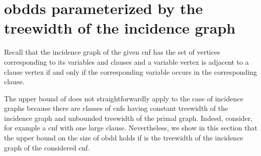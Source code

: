 \documentclass{article}
\begin{document}
\section{{\sc obdd}s parameterized by the treewidth of the incidence graph} \label{twinc}
Recall that the incidence graph of the given {\sc cnf}  has the set of vertices
corresponding to its variables and clauses and a variable vertex is adjacent to a clause vertex if and 
only if the corresponding variable occurs in the corresponding clause. 
\begin{comment}
It is not hard to see that the treewidth of the incidence graph 
of the given {\sc cnf}  is at most as the treewidth of the primal graph plus one. Indeed, for each clause  of , 
there is a clique in the primal graph of . Hence any tree decomposition of this primal graph has a bag 
containing all the variables of . Consequently, we just create a new leaf connected to the node of this bag 
and put into this leaf the clause  and all its variables. The resulting structure is a tree decomposition
of the incidence graph of  of width one more than the considered tree decomposition of the primal graph
of . It immediately follows that the  lower bound on the size of {\sc obdd} 
parameterized by the treewidth of the primal graph applies to the parameterization by the treewidth of the incidence graph.
\end{comment}
The upper bound of \cite{VardiTWD} does not straightforwardly apply to the 
case of incidence graphs because there are classes of {\sc cnf}s having constant treewidth of the 
incidence graph and unbounded treewidth of the primal graph. Indeed, consider, for example a {\sc cnf}
with one large clause. Nevertheless, we show in this section that the  upper bound on the
size of {\sc obdd} holds if  is the treewidth of the incidence graph of the considered {\sc cnf}.
\begin{comment}
Thus, together with the upper bound of \cite{VardiTWD}, the results of this paper provide a 
\emph{complete classification} of the expressive power of {\sc obdd} for {\sc cnf}s of bounded
treewidth of the primal or incidence graph.
\end{comment}
\begin{comment}
The treewidth of incidence
graph is known to be a `stronger' parameter than the treewidth of the primal graph in the following
sense.  On the one hand, there are classes 
of {\sc cnf}s (e.g. containing one big clause) with a small treewidth of the incidence graph and 
an unbounded treewidth of the primal graph and, on the other hand, 
In this section, since there are {\sc cnf}s with an 
\end{comment}
\end{document}
